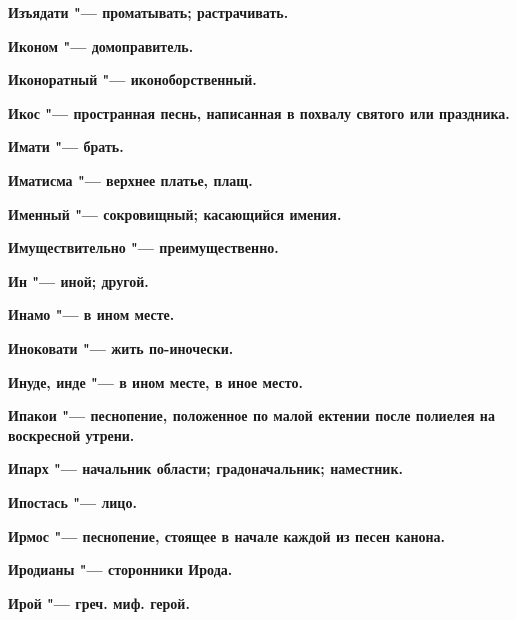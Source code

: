 \begin{multicols}{2}
\bfseries Изъядати\normalfont{} "--- проматывать; растрачивать. 




\bfseries Иконом\normalfont{} "--- домоправитель. 




\bfseries Иконоратный\normalfont{} "--- иконоборственный. 




\bfseries Икос\normalfont{} "--- пространная песнь, написанная в похвалу святого или праздника. 




\bfseries Имати\normalfont{} "--- брать. 




\bfseries Иматисма\normalfont{} "--- верхнее платье, плащ. 




\bfseries Именный\normalfont{} "--- сокровищный; касающийся имения. 




\bfseries Имуществительно\normalfont{} "--- преимущественно. 




\bfseries Ин\normalfont{} "--- иной; другой. 




\bfseries Инамо\normalfont{} "--- в ином месте. 




\bfseries Иноковати\normalfont{} "--- жить по-иночески. 




\bfseries Инуде, инде\normalfont{} "--- в ином месте, в иное место. 




\bfseries Ипакои\normalfont{} "--- песнопение, положенное по малой ектении после полиелея на воскресной утрени. 




\bfseries Ипарх\normalfont{} "--- начальник области; градоначальник; наместник. 




\bfseries Ипостась\normalfont{} "--- лицо. 




\bfseries Ирмос\normalfont{} "--- песнопение, стоящее в начале каждой из песен канона. 




\bfseries Иродианы\normalfont{} "--- сторонники Ирода. 




\bfseries Ирой\normalfont{} "--- греч. миф. герой. 





\end{multicols}
